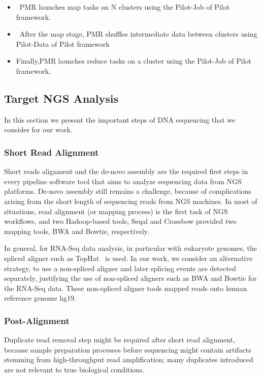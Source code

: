 \documentclass{acm_proc_article-sp}
\begin{document}
\begin{itemize}
\item{~PMR launches map tasks on N clusters using the Pilot-Job of Pilot framework.}
\item{~After the map stage, PMR shuffles intermediate data between clusters using Pilot-Data of Pilot framework} 
\item{Finally,PMR launches reduce tasks on a cluster using the Pilot-Job of Pilot framework.}
\end{itemize}

\subsection{Target NGS Analysis}

In this section we present the important steps of DNA sequencing that
we consider for our work.

\subsubsection{Short Read Alignment}

Short reads alignment and the de-novo assembly are the required first
steps in every pipeline software tool that aims to analyze sequencing
data from NGS platforms.  De-novo assembly still remains a challenge,
because of complications arising from the short length of sequencing
reads from NGS machines. In most of situations, read alignment (or mapping process)
is the first task of NGS workflows, and two Hadoop-based tools, Seqal and Crossbow provided two mapping tools, BWA and Bowtie, respectively. 

In general, for RNA-Seq data analysis, in particular with eukaryote
genomes, the spliced aligner such as TopHat~\cite{pepke2009} is
used. In our work, we consider an alternative strategy, to use a
non-spliced aligner and later splicing events are detected separately,
justifying the use of non-spliced aligners such as BWA and Bowtie for
the RNA-Seq data.  These non-spliced aligner tools mapped reads onto human reference genome hg19.

\subsubsection{Post-Alignment}
Duplicate read removal step might be required after short read
alignment, because sample preparation processes before sequencing
might contain artifacts stemming from high-throughput read
amplification; many duplicates introduced are not relevant to true
biological conditions. 
\end{document}
